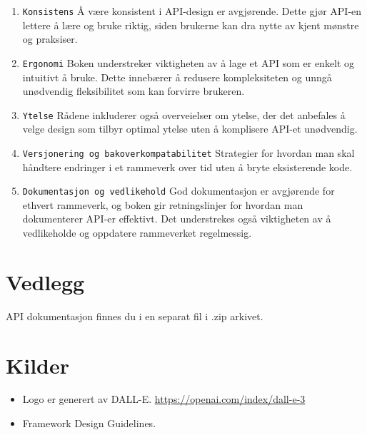 \documentclass[12pt]{article}
\begin{document}
\begin{enumerate}
    \item \texttt{Konsistens}
    Å være konsistent i API-design er avgjørende. 
    Dette gjør API-en lettere å lære og bruke riktig, siden brukerne kan dra nytte av kjent mønstre og praksiser.
    \item \texttt{Ergonomi}
    Boken understreker viktigheten av å lage et API som er enkelt og intuitivt å bruke. 
    Dette innebærer å redusere kompleksiteten og unngå unødvendig fleksibilitet som kan forvirre brukeren.
    \item \texttt{Ytelse}
    Rådene inkluderer også overveielser om ytelse, 
    der det anbefales å velge design som tilbyr optimal ytelse uten å komplisere API-et unødvendig.
    \item \texttt{Versjonering og bakoverkompatabilitet}
    Strategier for hvordan man skal håndtere endringer i et rammeverk over tid uten å bryte eksisterende kode.
    \item \texttt{Dokumentasjon og vedlikehold}
    God dokumentasjon er avgjørende for ethvert rammeverk, og boken gir retningslinjer for hvordan man dokumenterer API-er effektivt. 
    Det understrekes også viktigheten av å vedlikeholde og oppdatere rammeverket regelmessig.
\end{enumerate}

\section{Vedlegg}
API dokumentasjon finnes du i en separat fil i .zip arkivet.

\section{Kilder}
    \begin{itemize}
        \item Logo er generert av DALL-E. \url{https://openai.com/index/dall-e-3}
        \item Framework Design Guidelines.
    \end{itemize}
\end{document}
